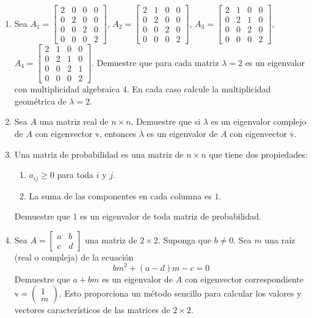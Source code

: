 \begin{enumerate}[resume]
    \item Sea $A_{1}=\begin{bmatrix*}2 & 0 & 0 & 0 \\ 0 & 2 & 0 & 0 \\ 0 & 0 & 2 & 0 \\ 0 & 0 & 0 & 2\end{bmatrix*}$, $A_{2}=\begin{bmatrix*}2 & 1 & 0 & 0 \\ 0 & 2 & 0 & 0 \\ 0 & 0 & 2 & 0 \\ 0 & 0 & 0 & 2\end{bmatrix*}$, $A_{3}=\begin{bmatrix*}2 & 1 & 0 & 0 \\ 0 & 2 & 1 & 0 \\ 0 & 0 & 2 & 0 \\ 0 & 0 & 0 & 2\end{bmatrix*}$, $A_{4}=\begin{bmatrix*}2 & 1 & 0 & 0 \\ 0 & 2 & 1 & 0 \\ 0 & 0 & 2 & 1 \\ 0 & 0 & 0 & 2\end{bmatrix*}$.
    Demuestre que para cada matriz $\lambda=2$ es un eigenvalor con multiplicidad algebraica $4$. En cada caso calcule la multiplicidad geométrica de $\lambda=2$.
    \item Sea $A$ una matriz real de $n \times n$. Demuestre que si $\lambda$ es un eigenvalor complejo de $A$ con eigenvector $\mathbb{v}$, entonces $\overline{\lambda}$ es un eigenvalor de $A$ con eigenvector $\overline{\mathbb{v}}$.
    \item Una matriz de probabilidad es una matriz de $n \times n$ que tiene dos propiedades:
    \begin{enumerate}
        \item $a_{i j} \geq 0$ para toda $i$ y $j$.
        \item La suma de las componentes en cada columna es $1$.
    \end{enumerate}
    Demuestre que $1$ es un eigenvalor de toda matriz de probabilidad.
    \item Sea $A=\begin{bmatrix*}a & b \\ c & d\end{bmatrix*}$ una matriz de $2 \times 2$. Suponga que $b \neq 0$. Sea $m$ una raíz (real o compleja) de la ecuación
    $$b m^{2}+(a-d) m-c=0$$
    Demuestre que $a+b m$ es un eigenvalor de $A$ con eigenvector correspondiente $\mathbb{v}=\begin{pmatrix*}1 \\ m\end{pmatrix*}$. Esto proporciona un método sencillo para calcular los valores y vectores característicos de las matrices de $2 \times 2$.\newpage

\end{enumerate}
